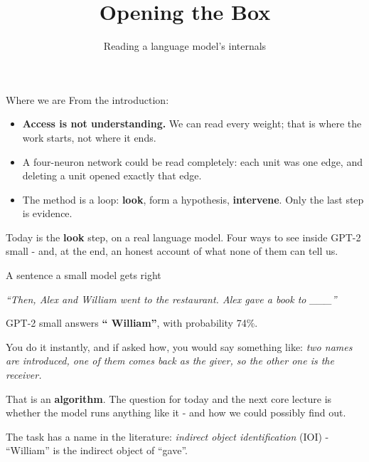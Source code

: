 \documentclass[aspectratio=169]{beamer}
\title{Opening the Box}
\subtitle{Reading a language model's internals}
\author{}
\date{}
\newcommand{\keybox}[1]{%
  \begin{tcolorbox}[colback=armblue!8, colframe=armblue, boxrule=0.6pt, arc=2pt]
  #1
  \end{tcolorbox}}
\newcommand{\promptbox}[1]{%
  \begin{center}
  \begin{tcolorbox}[colback=lightbg, colframe=gray, boxrule=0.5pt, arc=2pt, width=0.96\textwidth]
    \centering\textit{#1}
  \end{tcolorbox}
  \end{center}}
\begin{document}
\begin{frame}[plain]
  \titlepage
\end{frame}

\begin{frame}{Where we are}
  \vspace{0.5em}
  From the introduction:

  \vspace{0.5em}
  \begin{itemize}
    \item \textbf{Access is not understanding.} We can read every weight; that is where the work
      starts, not where it ends.
    \item A four-neuron network could be read completely: each unit was one edge, and deleting a
      unit opened exactly that edge.
    \item The method is a loop: \textbf{look}, form a hypothesis, \textbf{intervene}. Only the last
      step is evidence.
  \end{itemize}

  \vspace{0.8em}
  \keybox{Today is the \textbf{look} step, on a real language model. Four ways to see inside
  GPT-2 small - and, at the end, an honest account of what none of them can tell us.}
\end{frame}

\begin{frame}{A sentence a small model gets right}
  \promptbox{``Then, Alex and William went to the restaurant. Alex gave a book to \_\_\_''}

  \vspace{0.3em}
  GPT-2 small answers \textbf{`` William''}, with probability 74\%.

  \vspace{0.9em}
  You do it instantly, and if asked how, you would say something like: \emph{two names are
  introduced, one of them comes back as the giver, so the other one is the receiver.}

  \vspace{0.9em}
  \keybox{That is an \textbf{algorithm}. The question for today and the next core lecture is whether
  the model runs anything like it - and how we could possibly find out.}

  \vspace{0.4em}
  {\footnotesize The task has a name in the literature: \emph{indirect object identification}
  (IOI) - ``William'' is the indirect object of ``gave''.}
\end{frame}
\end{document}
